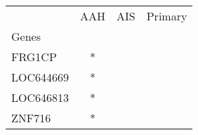 \begin{tabular}{lccc}
\toprule
{} & AAH & AIS & Primary \\
Genes     &     &     &         \\
\midrule
FRG1CP    &   * &     &         \\
LOC644669 &   * &     &         \\
LOC646813 &   * &     &         \\
ZNF716    &   * &     &         \\
\bottomrule
\end{tabular}
